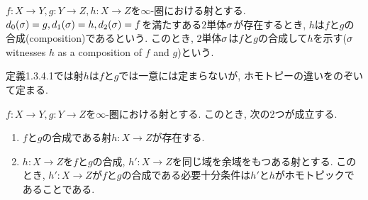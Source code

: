 \documentclass[uplatex, a4paper, 14Q, dvipdfmx]{jsreport}
\begin{document}
\begin{definition}
  $f:X \to Y, g: Y \to Z, h: X \to Z$を$\infty$-圏における射とする. 
  $d_0(\sigma)=g, d_1(\sigma)=h, d_2(\sigma)=f$を満たすある$2$単体$\sigma$が存在するとき, $h$は$f$と$g$の合成(composition)であるという. 
  このとき, $2$単体$\sigma$は$f$と$g$の合成して$h$を示す($\sigma$ witnesses $h$ as a composition of $f$ and $g$)という. 
  \begin{center}
  \end{center}
\end{definition}

定義1.3.4.1では射$h$は$f$と$g$では一意には定まらないが, ホモトピーの違いをのぞいて定まる. 

\begin{prop}
  $f:X \to Y, g: Y \to Z$を$\infty$-圏における射とする. 
  このとき, 次の2つが成立する. 
  \begin{enumerate}
    \item $f$と$g$の合成である射$h: X \to Z$が存在する. 
    \item $h: X \to Z$を$f$と$g$の合成, $h': X \to Z$を同じ域を余域をもつある射とする. 
    このとき, $h': X \to Z$が$f$と$g$の合成である必要十分条件は$h'$と$h$がホモトピックであることである. 
  \end{enumerate}
\end{prop}
\end{document}
